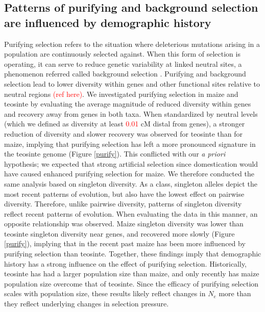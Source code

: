 \documentclass{pnastwo}
\begin{document}
\begin{article}
\subsection{Patterns of purifying and background selection are
  influenced by demographic history}
Purifying selection refers to the situation where deleterious
mutations arising in a population are continuously selected against. When this
form of selection is operating, it can serve to reduce genetic
variability at linked neutral sites, a phenomenon referred called
background selection \cite{charlesworth1993}. Purifying and background selection lead
to lower diversity within genes and other functional sites relative
to neutral regions \textcolor{red}{(ref here)}. We investigated purifying
selection in maize and teosinte by evaluating the average magnitude of reduced
diversity within genes and recovery away from genes in both taxa. When standardized by neutral
levels (which we defined as diversity at least \textcolor{red}{0.01} cM distal
from genes), a stronger reduction of diversity
and slower recovery was observed for teosinte than for maize, implying
that purifying selection has left a more pronounced signature in the
teosinte genome (Figure \ref{purify}). This conflicted with our \emph{a priori} hypothesis;
we expected that strong artificial selection since domestication would
have caused enhanced purifying selection for maize. We therefore
conducted the same analysis based on singleton diversity. As a class,
singleton alleles depict the most recent patterns of evolution, but
also have the lowest effect on pairwise diversity. Therefore, unlike
pairwise diversity, patterns of singleton
diversity reflect recent patterns of evolution. When
evaluating the data in this manner, an opposite relationship was
observed. Maize singleton diversity was lower than teosinte singleton
diversity near genes, and recovered more slowly
(Figure \ref{purify}), implying that in the
recent past maize has been more influenced by purifying selection than
teosinte. Together, these findings imply that demographic history has
a strong influence on the effect of purifying selection. Historically,
teosinte has had a larger population size than maize, and only
recently has maize population size overcome that of teosinte. Since
the efficacy of purifying selection scales with population size,
these results likely reflect changes in $N_e$ more than they reflect
underlying changes in selection pressure.



\end{article}
\end{document}
